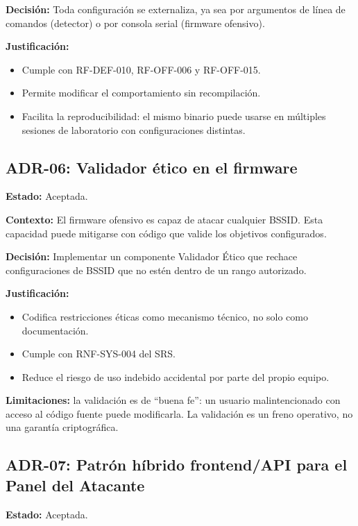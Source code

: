 \documentclass[11pt,a4paper]{article}
\begin{document}
\textbf{Decisión:} Toda configuración se externaliza, ya sea por
argumentos de línea de comandos (detector) o por consola serial
(firmware ofensivo).

\textbf{Justificación:}

\begin{itemize}
  \item Cumple con RF-DEF-010, RF-OFF-006 y RF-OFF-015.
  \item Permite modificar el comportamiento sin recompilación.
  \item Facilita la reproducibilidad: el mismo binario puede usarse en
    múltiples sesiones de laboratorio con configuraciones distintas.
\end{itemize}

\subsection{ADR-06: Validador ético en el firmware}

\textbf{Estado:} Aceptada.

\textbf{Contexto:} El firmware ofensivo es capaz de atacar cualquier
BSSID. Esta capacidad puede mitigarse con código que valide los objetivos
configurados.

\textbf{Decisión:} Implementar un componente Validador Ético que rechace
configuraciones de BSSID que no estén dentro de un rango autorizado.

\textbf{Justificación:}

\begin{itemize}
  \item Codifica restricciones éticas como mecanismo técnico, no solo como
    documentación.
  \item Cumple con RNF-SYS-004 del SRS.
  \item Reduce el riesgo de uso indebido accidental por parte del propio
    equipo.
\end{itemize}

\textbf{Limitaciones:} la validación es de ``buena fe'': un usuario
malintencionado con acceso al código fuente puede modificarla. La
validación es un freno operativo, no una garantía criptográfica.

\subsection{ADR-07: Patrón híbrido frontend/API para el Panel del Atacante}

\textbf{Estado:} Aceptada.
\end{document}
